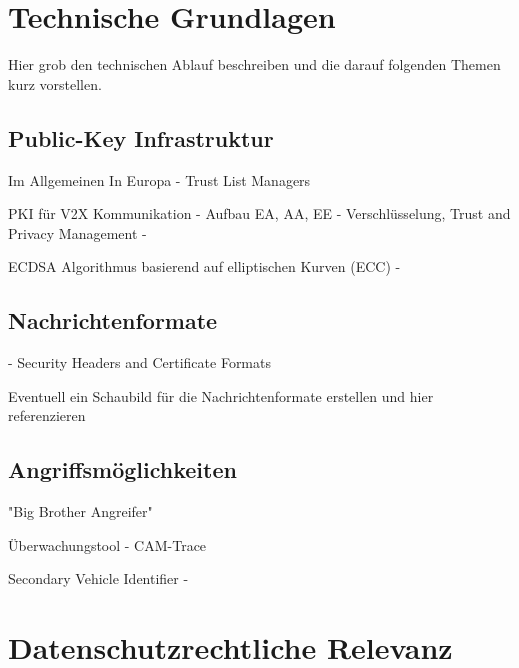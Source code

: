 
\section{Technische Grundlagen}
\label{ch:FirstContentSection}


Hier grob den technischen Ablauf beschreiben und die darauf folgenden Themen kurz vorstellen.

\subsection{Public-Key Infrastruktur}
\label{sec:FirstContentSection:FirstSubSection}
Im Allgemeinen
In Europa - Trust List Managers

PKI für V2X Kommunikation - Aufbau EA, AA, EE - \cite{Strubbe2017}
Verschlüsselung, Trust and Privacy Management - \cite{ETSI2018}

ECDSA Algorithmus basierend auf elliptischen Kurven (ECC) - \cite{Barker2013}

\subsection{Nachrichtenformate}
\label{sec:FirstContentSection:SecondSubSection}

\cite{ETSI2013} - Security Headers and Certificate Formats

Eventuell ein Schaubild für die Nachrichtenformate erstellen und hier referenzieren

\subsection{Angriffsmöglichkeiten}
\label{sec:FirstContentSection:ThirdSubSection}

"Big Brother Angreifer" \cite{Wiedersheim2010}

Überwachungstool - CAM-Trace

Secondary Vehicle Identifier - \cite{Ullmann2016}

\section{Datenschutzrechtliche Relevanz}
\label{ch:SecondContentSection}

